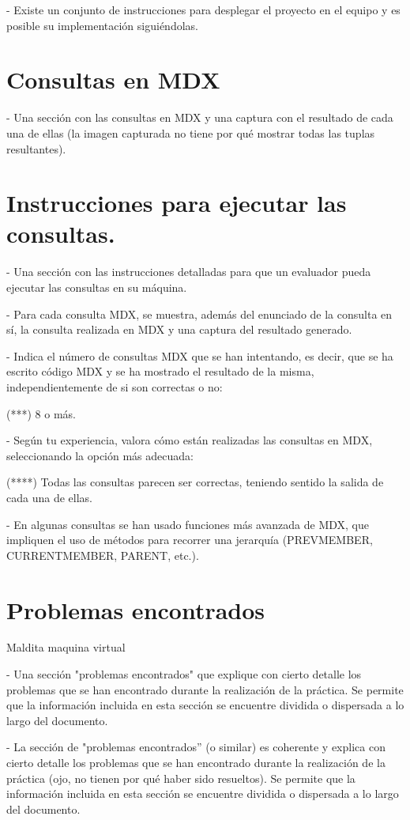 \documentclass[12pt, a4paper, twoside]{article}
\begin{document}
	  - Existe un conjunto de instrucciones para desplegar el proyecto en el equipo y es posible su implementación siguiéndolas. 
	
	\section{Consultas en MDX}
	- Una sección con las consultas en MDX y una captura con el resultado de cada una de ellas (la imagen capturada no tiene por qué mostrar todas las tuplas resultantes). 
	
	
	\section{Instrucciones para ejecutar las consultas.}
	- Una sección con las instrucciones detalladas para que un evaluador pueda ejecutar las consultas en su máquina. 
	
	
		- Para cada consulta MDX, se muestra, además del enunciado de la consulta en sí, la consulta realizada en MDX y una captura del resultado generado.
	
	- Indica el número de consultas MDX que se han intentando, es decir, que se ha escrito código MDX y se ha mostrado el resultado de la misma, independientemente de si son correctas o no:
	
	(***) 8 o más.
	
	
	- Según tu experiencia, valora cómo están realizadas las consultas en MDX, seleccionando la opción más adecuada:
	
	(****) Todas las consultas parecen ser correctas, teniendo sentido la salida de cada una de ellas. 
	
	
	- En algunas consultas se han usado funciones más avanzada de MDX, que impliquen el uso de métodos para recorrer una jerarquía (PREVMEMBER, CURRENTMEMBER, PARENT, etc.). 

	\section{Problemas encontrados}


	Maldita maquina virtual




	- Una sección "problemas encontrados" que explique con cierto detalle los problemas que se han encontrado durante la realización de la práctica. Se permite que la información incluida en esta sección se encuentre dividida o dispersada a lo largo del documento. 

	- La sección de "problemas encontrados” (o similar) es coherente y explica con cierto detalle los problemas que se han encontrado durante la realización de la práctica (ojo, no tienen por qué haber sido resueltos). Se permite que la información incluida en esta sección se encuentre dividida o dispersada a lo largo del documento.
	
\end{document}
